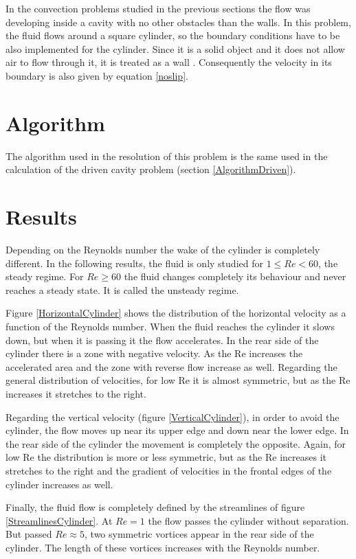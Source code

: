 In the convection problems studied in the previous sections the flow was developing inside a cavity with no other obstacles than the walls. In this problem, the fluid flows around a square cylinder, so the boundary conditions have to be also implemented for the cylinder. Since it is a solid object and it does not allow air to flow through it, it is treated as a wall \cite{Ferziger2002}. Consequently the velocity in its boundary is also given by equation \ref{noslip}.

\section{Algorithm}
The algorithm used in the resolution of this problem is the same used in the calculation of the driven cavity problem (section \ref{AlgorithmDriven}).

\section{Results}
Depending on the Reynolds number the wake of the cylinder is completely different. In the following results, the fluid is only studied for $1\leq Re<60$, the steady regime. For $Re\geq60$ the fluid changes completely its behaviour and never reaches a steady state. It is called the unsteady regime.

Figure \ref{HorizontalCylinder} shows the distribution of the horizontal velocity as a function of the Reynolds number. When the fluid reaches the cylinder it slows down, but when it is passing it the flow accelerates. In the rear side of the cylinder there is a zone with negative velocity. As the Re increases the accelerated area and the zone with reverse flow increase as well. Regarding the general distribution of velocities, for low Re it is almost symmetric, but as the Re increases it stretches to the right.

Regarding the vertical velocity (figure \ref{VerticalCylinder}), in order to avoid the cylinder, the flow moves up near its upper edge and down near the lower edge. In the rear side of the cylinder the movement is completely the opposite. Again, for low Re the distribution is more or less symmetric, but as the Re increases it stretches to the right and the gradient of velocities in the frontal edges of the cylinder increases as well.

Finally, the fluid flow is completely defined by the streamlines of figure \ref{StreamlinesCylinder}. At $Re=1$ the flow passes the cylinder without separation. But passed $Re\approx5$, two symmetric vortices appear in the rear side of the cylinder. The length of these vortices increases with the Reynolds number.

